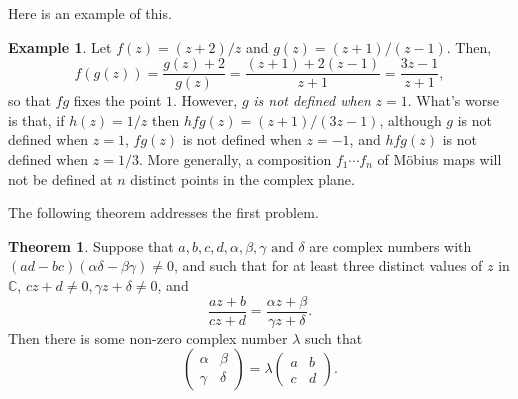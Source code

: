 \documentclass[12pt]{book}
\newcommand{\CC}{\mathbb C}
\theoremstyle{definition}
\newtheorem{example}{Example}[section]
\newtheorem{theorem}{Theorem}[chapter]
\theoremstyle{remark}
\begin{document}
		Here is an example of this.
		\begin{example}
			Let $f(z) = (z + 2)/ z$ and $g(z) = (z + 1)/(z - 1)$. Then,
			\begin{equation*}
				f(g(z)) = \frac{g(z) + 2}{g(z)} = \frac{(z + 1)+ 2(z-1)}{z+ 1} = \frac{3z - 1}{z + 1},
			\end{equation*}
			so that $fg$ fixes the point $1$. However, $g$ \textit{is not defined when} $z = 1$. What's worse is that, if $h(z) = 1/z$ then $hfg(z) = (z+1)/(3z - 1)$, although $g$ is not defined when $z = 1$, $fg(z)$ is not defined when $z = -1$, and $hfg(z)$ is not defined when $z = 1/3$. More generally, a composition $f_1 \cdots f_n$ of M\"obius maps will not be defined at $n$ distinct points in the complex plane.
		\end{example}
		The following theorem addresses the first problem.
		\begin{theorem}
			Suppose that $a, b, c, d, \alpha, \beta, \gamma \text{ and } \delta$ are complex numbers with ${(ad - bc)}{(\alpha\delta - \beta\gamma)}{ \neq 0}$, and such that for at least three distinct values of $z$ in $\CC$, $cz + d \neq 0, \gamma z+ \delta \neq 0$, and
			\begin{equation*}
				\frac{az + b}{cz + d} = \frac{\alpha z + \beta}{\gamma z + \delta}.
			\end{equation*}
			Then there is some non-zero complex number $\lambda$ such that
			\begin{equation}
				\begin{pmatrix}
					\alpha & \beta \\
					\gamma & \delta
				\end{pmatrix}
				= \lambda\begin{pmatrix}
					a & b \\
					c & d
				\end{pmatrix}.
			\end{equation}
		\end{theorem}
\end{document}

